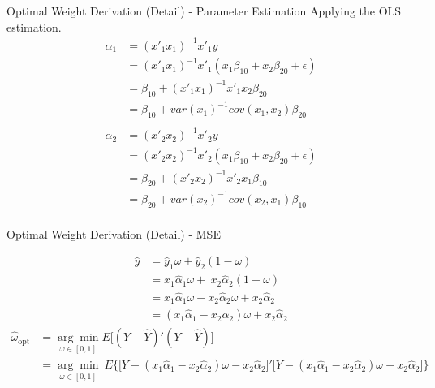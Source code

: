 \begin{frame}{Optimal Weight Derivation (Detail) - Parameter Estimation}
    Applying the OLS estimation.
\vspace{-0.2mm}
\begin{align*}
    \hat\alpha_{1} &= (x'_1x_1)^{-1} x'_1y \\
    &= (x'_1x_1)^{-1} x'_1(x_1 \beta_{10} + x_2 \beta_{20} + \epsilon) \\
    &= \beta_{10} + (x'_1x_1)^{-1} x'_1x_2 \beta_{20} \\
    &= \beta_{10} + var(x_1)^{-1} cov(x_1,x_2) \beta_{20} \\
    \\
    \hat\alpha_{2} &= (x'_2x_2)^{-1} x'_2y \\
    &= (x'_2x_2)^{-1} x'_2(x_1 \beta_{10} + x_2 \beta_{20} + \epsilon) \\
    &= \beta_{20} + (x'_2x_2)^{-1} x'_2x_1 \beta_{10} \\
    &= \beta_{20} + var(x_2)^{-1} cov(x_2,x_1) \beta_{10} \\
\end{align*}
    
\end{frame}


\begin{frame}{Optimal Weight Derivation (Detail) - MSE}

\begin{align*}
    \hat y &= \hat y_1 \omega + \hat y_2 (1-\omega) \\
    &= x_1 \hat\alpha_1 \omega + \ x_2 \hat\alpha_2 (1-\omega) \\
    &= x_1 \hat\alpha_1 \omega - x_2 \hat\alpha_2 \omega + x_2 \hat\alpha_2 \\
    &= (x_1 \hat\alpha_1 - x_2 \hat\alpha_2) \omega + x_2 \hat\alpha_2
\end{align*}
\begin{align*}
\hat{\omega}_{\text{opt}} 
&= \underset{\omega \in [0,1]}{\arg\min} E\big[(Y - \hat Y)' (Y - \hat Y) \big] \\
&= \underset{\omega \in [0,1]}{\arg\min} \ E\bigg\{\big[Y-(x_1 \hat\alpha_1 - x_2 \hat\alpha_2) \omega - x_2 \hat\alpha_2\big]'\big[Y-(x_1 \hat\alpha_1 - x_2 \hat\alpha_2) \omega - x_2 \hat\alpha_2\big]\bigg\}
\end{align*}
\end{frame}



